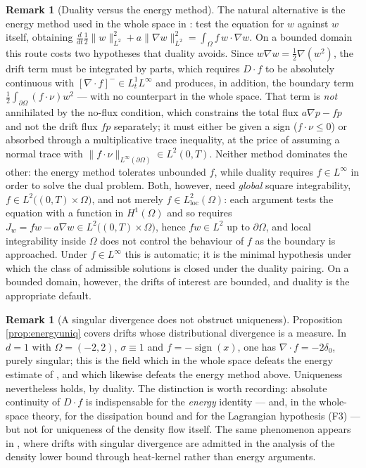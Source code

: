 \documentclass[11pt]{amsart}
\theoremstyle{definition}
\newtheorem{remark}[theorem]{Remark}
\newcommand{\dive}{\nabla\!\cdot}
\begin{document}
\begin{remark}[Duality versus the energy method]\label{rem:duality}
The natural alternative is the energy method used in the whole space
in \cite[Theorem~3.1]{pfode}: test the equation for $w$ against $w$
itself, obtaining
$\frac{d}{dt}\tfrac12\|w\|_{L^2}^2+a\|\nabla
w\|_{L^2}^2=\int_\Omega f\,w\cdot\nabla w$. On a bounded domain this
route costs two hypotheses that duality avoids. Since
$w\nabla w=\tfrac12\nabla(w^2)$, the drift term must be integrated
by parts, which requires $D\!\cdot f$ to be absolutely continuous
with $[\dive f]^-\in L^1_tL^\infty$ and produces, in addition, the
boundary term $\tfrac12\int_{\partial\Omega}(f\cdot\nu)w^2$ --- with
no counterpart in the whole space. That term is \emph{not}
annihilated by the no-flux condition, which constrains the total
flux $a\nabla p-fp$ and not the drift flux $fp$ separately; it must
either be given a sign ($f\cdot\nu\le0$) or absorbed through a
multiplicative trace inequality, at the price of assuming a normal
trace with $\|f\cdot\nu\|_{L^\infty(\partial\Omega)}\in L^2(0,T)$.
Neither method dominates the other: the energy method tolerates
unbounded $f$, while duality requires $f\in L^\infty$ in order to
solve the dual problem. Both, however, need \emph{global} square
integrability, $f\in L^2\big((0,T)\times\Omega\big)$, and not merely
$f\in L^2_{\mathrm{loc}}(\Omega)$: each argument tests the equation
with a function in $H^1(\Omega)$ and so requires $J_w=fw-a\nabla
w\in L^2\big((0,T)\times\Omega\big)$, hence $fw\in L^2$ up to
$\partial\Omega$, and local integrability inside $\Omega$ does not
control the behaviour of $f$ as the boundary is approached. Under
$f\in L^\infty$ this is automatic; it is the minimal hypothesis
under which the class of admissible solutions is closed under the
duality pairing. On a bounded domain, however, the drifts of interest are
bounded, and duality is the appropriate default.
\end{remark}

\begin{remark}[A singular divergence does not obstruct uniqueness]
\label{rem:signfield}
Proposition \ref{prop:energyuniq} covers drifts whose distributional
divergence is a measure. In $d=1$ with $\Omega=(-2,2)$, $\sigma\equiv
1$ and $f=-\operatorname{sign}(x)$, one has $\dive f=-2\delta_0$,
purely singular; this is the field which in the whole space defeats
the energy estimate of \cite[Remark~3.3]{pfode}, and which likewise
defeats the energy method above. Uniqueness nevertheless holds, by
duality. The distinction is worth recording: absolute continuity of
$D\!\cdot f$ is indispensable for the \emph{energy} identity ---
and, in the whole-space theory, for the dissipation bound and for
the Lagrangian hypothesis \textup{(F3)} --- but not for uniqueness
of the density flow itself. The same phenomenon appears in
\cite{pfode}, where drifts with singular divergence are admitted in
the analysis of the density lower bound through heat-kernel rather
than energy arguments.
\end{remark}
\end{document}
